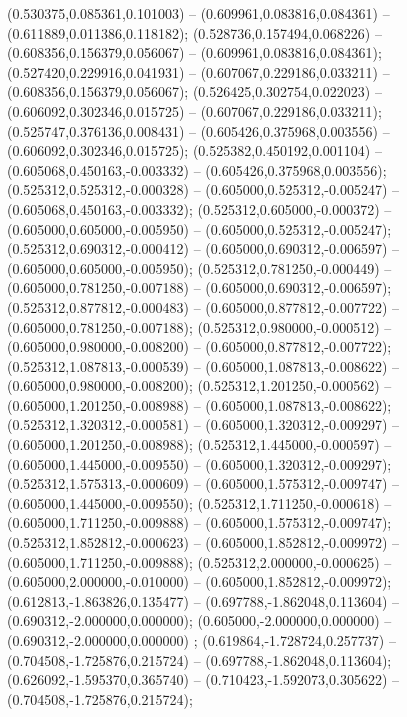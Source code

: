  (0.530375,0.085361,0.101003) -- (0.609961,0.083816,0.084361) -- (0.611889,0.011386,0.118182);
 (0.528736,0.157494,0.068226) -- (0.608356,0.156379,0.056067) -- (0.609961,0.083816,0.084361);
 (0.527420,0.229916,0.041931) -- (0.607067,0.229186,0.033211) -- (0.608356,0.156379,0.056067);
 (0.526425,0.302754,0.022023) -- (0.606092,0.302346,0.015725) -- (0.607067,0.229186,0.033211);
 (0.525747,0.376136,0.008431) -- (0.605426,0.375968,0.003556) -- (0.606092,0.302346,0.015725);
 (0.525382,0.450192,0.001104) -- (0.605068,0.450163,-0.003332) -- (0.605426,0.375968,0.003556);
 (0.525312,0.525312,-0.000328) -- (0.605000,0.525312,-0.005247) -- (0.605068,0.450163,-0.003332);
 (0.525312,0.605000,-0.000372) -- (0.605000,0.605000,-0.005950) -- (0.605000,0.525312,-0.005247);
 (0.525312,0.690312,-0.000412) -- (0.605000,0.690312,-0.006597) -- (0.605000,0.605000,-0.005950);
 (0.525312,0.781250,-0.000449) -- (0.605000,0.781250,-0.007188) -- (0.605000,0.690312,-0.006597);
 (0.525312,0.877812,-0.000483) -- (0.605000,0.877812,-0.007722) -- (0.605000,0.781250,-0.007188);
 (0.525312,0.980000,-0.000512) -- (0.605000,0.980000,-0.008200) -- (0.605000,0.877812,-0.007722);
 (0.525312,1.087813,-0.000539) -- (0.605000,1.087813,-0.008622) -- (0.605000,0.980000,-0.008200);
 (0.525312,1.201250,-0.000562) -- (0.605000,1.201250,-0.008988) -- (0.605000,1.087813,-0.008622);
 (0.525312,1.320312,-0.000581) -- (0.605000,1.320312,-0.009297) -- (0.605000,1.201250,-0.008988);
 (0.525312,1.445000,-0.000597) -- (0.605000,1.445000,-0.009550) -- (0.605000,1.320312,-0.009297);
 (0.525312,1.575313,-0.000609) -- (0.605000,1.575312,-0.009747) -- (0.605000,1.445000,-0.009550);
 (0.525312,1.711250,-0.000618) -- (0.605000,1.711250,-0.009888) -- (0.605000,1.575312,-0.009747);
 (0.525312,1.852812,-0.000623) -- (0.605000,1.852812,-0.009972) -- (0.605000,1.711250,-0.009888);
 (0.525312,2.000000,-0.000625) -- (0.605000,2.000000,-0.010000) -- (0.605000,1.852812,-0.009972);
 (0.612813,-1.863826,0.135477) -- (0.697788,-1.862048,0.113604) -- (0.690312,-2.000000,0.000000);
 (0.605000,-2.000000,0.000000) -- (0.690312,-2.000000,0.000000) ;
 (0.619864,-1.728724,0.257737) -- (0.704508,-1.725876,0.215724) -- (0.697788,-1.862048,0.113604);
 (0.626092,-1.595370,0.365740) -- (0.710423,-1.592073,0.305622) -- (0.704508,-1.725876,0.215724);
